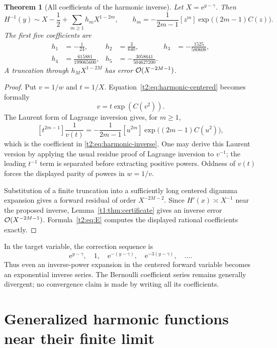 \documentclass[11pt,openany]{book}
\numberwithin{equation}{chapter}
\theoremstyle{plain}
\newtheorem{theorem}{Theorem}[chapter]
\theoremstyle{definition}
\theoremstyle{remark}
\newcommand{\ee}{\mathrm e}
\begin{document}
\begin{theorem}[All coefficients of the harmonic inverse]
\label{t2:thm:harmonic-inverse}
Let $X=\ee^{y-\gamma}$. Then
\begin{equation}
 H^{-1}(y)\sim X-\frac12+\sum_{m\ge1}h_mX^{1-2m},
 \qquad
 h_m=-\frac1{2m-1}[z^m]\exp\bigl((2m-1)C(z)\bigr).
 \label{t2:eq:harmonic-inverse}
\end{equation}
The first five coefficients are
\begin{align}
 h_1&=-\frac1{24},&h_2&=\frac3{640},&
 h_3&=-\frac{1525}{580608},\nonumber\\
 h_4&=\frac{615881}{199065600},&
 h_5&=-\frac{3058641}{504627200}.
 \label{t2:eq:harmonic-coeff}
\end{align}
A truncation through $h_MX^{1-2M}$ has error $\mathcal O(X^{-2M-1})$.
\end{theorem}
\begin{proof}
Put $v=1/w$ and $t=1/X$. Equation~\eqref{t2:eq:harmonic-centered} becomes formally
\[
 v=t\exp(C(v^2)).
\]
The Laurent form of Lagrange inversion gives, for $m\ge1$,
\[
 [t^{2m-1}]\frac1{v(t)}
 =-\frac1{2m-1}[u^{2m}]
             \exp\bigl((2m-1)C(u^2)\bigr),
\]
which is the coefficient in \eqref{t2:eq:harmonic-inverse}. One may derive this Laurent version by applying the usual residue proof of Lagrange inversion to $v^{-1}$; the leading $t^{-1}$ term is separated before extracting positive powers. Oddness of $v(t)$ forces the displayed parity of powers in $w=1/v$.

Substitution of a finite truncation into a sufficiently long centered digamma expansion gives a forward residual of order $X^{-2M-2}$. Since $H'(x)\asymp X^{-1}$ near the proposed inverse, Lemma~\ref{t1:thm:certificate} gives an inverse error $\mathcal O(X^{-2M-1})$. Formula~\eqref{t2:eq:E} computes the displayed rational coefficients exactly.
\end{proof}

In the target variable, the correction sequence is
\[
 \ee^{y-\gamma},\quad 1,\quad
 \ee^{-(y-\gamma)},\quad\ee^{-3(y-\gamma)},\quad\ldots.
\]
Thus even an inverse-power expansion in the centered forward variable becomes an exponential inverse series. The Bernoulli coefficient series remains generally divergent; no convergence claim is made by writing all its coefficients.

\section{Generalized harmonic functions near their finite limit}
\end{document}
